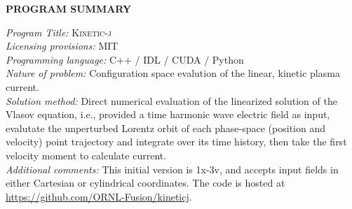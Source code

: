 \documentclass[final,5p,times,twocolumn]{elsarticle}
\newcommand{\kj}{\textsc{Kinetic-j}\xspace}
\begin{document}
\linenumbers


{\bf PROGRAM SUMMARY}

\begin{small}
\noindent
{\em Program Title:} \kj                           \\
{\em Licensing provisions: }MIT                             \\
{\em Programming language: }C++ / IDL / CUDA / Python        \\
{\em Nature of problem: }Configuration space evalution of the linear, kinetic plasma current.\\
{\em Solution method: }Direct numerical evaluation of the linearized solution of the Vlasov equation, i.e., provided a time harmonic wave electric field as input, evalutate the unperturbed Lorentz orbit of each phase-space (position and velocity) point trajectory and integrate over its time history, then take the first velocity moment to calculate current.\\
{\em Additional comments:} This initial version is 1x-3v, and accepts input fields in either Cartesian or cylindrical coordinates. The code is hosted at \url{https://github.com/ORNL-Fusion/kineticj}.\\
\end{small}
%
\end{document}
